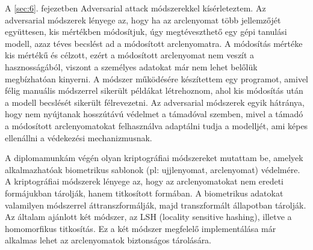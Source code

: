 A \ref{sec:6}. fejezetben Adversarial attack módszerekkel kísérleteztem. Az adversarial módszerek lényege az, hogy ha az arclenyomat több jellemzőjét együttesen, kis mértékben módosítjuk, úgy megtéveszthető egy gépi tanulási modell, azaz téves becslést ad a módosított arclenyomatra. A módosítás mértéke kis mértékű és célzott, ezért a módosított arclenyomat nem veszít a hasznosságából, viszont a személyes adatokat már nem lehet belőlük megbízhatóan kinyerni. A módszer működésére készítettem egy programot, amivel félig manuális módszerrel sikerült példákat létrehoznom, ahol kis módosítás után a modell becslését sikerült félrevezetni. Az adversarial módszerek egyik hátránya, hogy nem nyújtanak hosszútávú védelmet a támadóval szemben, mivel a támadó a módosított arclenyomatokat felhasználva adaptálni tudja a modelljét, ami képes ellenállni a védekezési mechanizmusnak.

A diplomamunkám végén olyan kriptográfiai módszereket mutattam be, amelyek alkalmazhatóak biometrikus sablonok (pl: ujjlenyomat, arclenyomat) védelmére. A kriptográfiai módszerek lényege az, hogy az arclenyomatokat nem eredeti formájukban tárolják, hanem titkosított formában. A biometrikus adatokat valamilyen módszerrel áttranszformálják, majd transzformált állapotban tárolják. Az általam ajánlott két módszer, az LSH (locality sensitive hashing), illetve a homomorfikus titkosítás. Ez a két módszer megfelelő implementálása már alkalmas lehet az arclenyomatok biztonságos tárolására.







